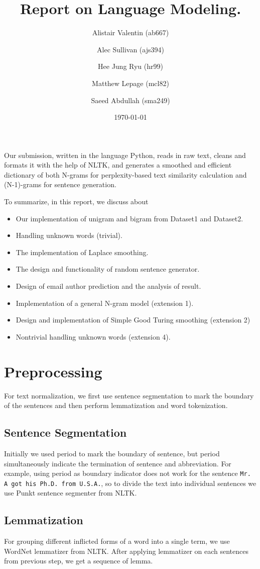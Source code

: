 \documentclass[12pt]{article}
\title{Report on Language Modeling.}
\author{Alistair Valentin (ab667)\\
\and Alec Sullivan (ajs394)\\
\and Hee Jung Ryu (hr99)\\
\and Matthew Lepage (mcl82)\\
\and Saeed Abdullah (sma249)}
\date \today
\begin{document}
\maketitle

Our submission, written in the language Python, reads in raw text, cleans and formats it with the help of NLTK, and generates a smoothed and efficient dictionary of both N-grams for perplexity-based text similarity calculation and (N-1)-grams for sentence generation.

To summarize, in this report, we discuss about
\begin{itemize}
\item Our implementation of unigram and bigram from Dataset1 and Dataset2.
\item Handling unknown words (trivial).
\item The implementation of Laplace smoothing.
\item The design and functionality of random sentence generator.
\item Design of email author prediction and the analysis of result.
\item Implementation of a general N-gram model (extension 1).
\item Design and implementation of Simple Good Turing smoothing (extension 2)
\item Nontrivial handling unknown words (extension 4).
\end{itemize}
\section{Preprocessing}

For text normalization, we first use sentence segmentation to mark the boundary
of the sentences and then perform lemmatization and word tokenization.



\subsection{Sentence Segmentation}
Initially we used period to mark the boundary of sentence, but period
simultaneously indicate the termination of sentence and abbreviation. For
example, using period as boundary indicator does not work for 
the sentence \texttt{Mr. A got his Ph.D. from U.S.A.}, so to divide the
text into individual sentences we use Punkt sentence segmenter
\cite{kiss2006unsupervised} from NLTK.

\subsection{Lemmatization}
For grouping different inflicted forms of a word into a single term, we use
WordNet lemmatizer from NLTK. After applying lemmatizer on each sentences
from previous step, we get a sequence of lemma.
\end{document}
